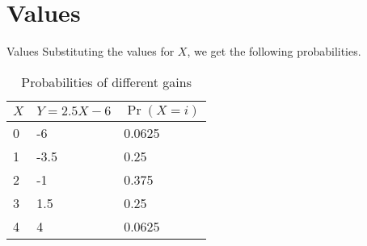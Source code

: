 \documentclass{beamer}
\providecommand{\pr}[1]{\ensuremath{\Pr\left(#1\right)}}
\begin{document}
\section{Values}
\begin{frame}{Values}
    Substituting the values for $X$, we get the following probabilities.


    \centering
    \begin{table}
    \begin{tabular}{|l|l|l|}
        \hline
        $X$ & $Y = 2.5 X - 6$ & $\pr{X = i}$ \\
        \hline
        0 & -6 & 0.0625 \\
        1 & -3.5 & 0.25 \\
        2 & -1 & 0.375 \\
        3 & 1.5 & 0.25 \\
        4 & 4 & 0.0625 \\
        \hline
    \end{tabular}
    \caption{Probabilities of different gains}
    \end{table}

\end{frame}
\end{document}
